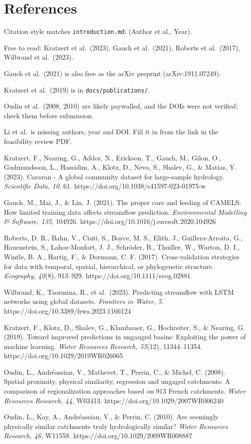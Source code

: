 \section{References}\label{references}

Citation style matches \texttt{introduction.md}: (Author et al., Year).

Free to read: Kratzert et al.~(2023), Gauch et al.~(2021), Roberts et
al.~(2017), Wilbrand et al.~(2023).

Gauch et al.~(2021) is also free as the arXiv preprint
(arXiv:1911.07249).

Kratzert et al.~(2019) is in \texttt{docs/publications/}.

Oudin et al.~(2008, 2010) are likely paywalled, and the DOIs were not
verified; check them before submission.

Li et al.~is missing authors, year and DOI. Fill it in from the link in
the feasibility review PDF.

Kratzert, F., Nearing, G., Addor, N., Erickson, T., Gauch, M., Gilon,
O., Gudmundsson, L., Hassidim, A., Klotz, D., Nevo, S., Shalev, G., \&
Matias, Y. (2023). Caravan - A global community dataset for large-sample
hydrology. \emph{Scientific Data, 10}, 61.
https://doi.org/10.1038/s41597-023-01975-w

Gauch, M., Mai, J., \& Lin, J. (2021). The proper care and feeding of
CAMELS: How limited training data affects streamflow prediction.
\emph{Environmental Modelling \& Software, 135}, 104926.
https://doi.org/10.1016/j.envsoft.2020.104926

Roberts, D. R., Bahn, V., Ciuti, S., Boyce, M. S., Elith, J.,
Guillera-Arroita, G., Hauenstein, S., Lahoz-Monfort, J. J., Schröder,
B., Thuiller, W., Warton, D. I., Wintle, B. A., Hartig, F., \& Dormann,
C. F. (2017). Cross-validation strategies for data with temporal,
spatial, hierarchical, or phylogenetic structure. \emph{Ecography,
40}(8), 913--929. https://doi.org/10.1111/ecog.02881

Wilbrand, K., Taormina, R., et al.~(2023). Predicting streamflow with
LSTM networks using global datasets. \emph{Frontiers in Water, 5}.
https://doi.org/10.3389/frwa.2023.1166124

Kratzert, F., Klotz, D., Shalev, G., Klambauer, G., Hochreiter, S., \&
Nearing, G. (2019). Toward improved predictions in ungauged basins:
Exploiting the power of machine learning. \emph{Water Resources
Research, 55}(12), 11344--11354. https://doi.org/10.1029/2019WR026065

Oudin, L., Andréassian, V., Mathevet, T., Perrin, C., \& Michel, C.
(2008). Spatial proximity, physical similarity, regression and ungaged
catchments: A comparison of regionalization approaches based on 913
French catchments. \emph{Water Resources Research, 44}, W03413.
https://doi.org/10.1029/2007WR006240

Oudin, L., Kay, A., Andréassian, V., \& Perrin, C. (2010). Are seemingly
physically similar catchments truly hydrologically similar? \emph{Water
Resources Research, 46}, W11558. https://doi.org/10.1029/2009WR008887
